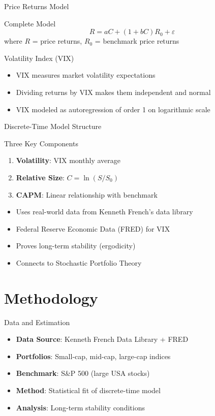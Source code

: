 \documentclass{beamer}
\begin{document}
\begin{frame}{Price Returns Model}
\begin{block}{Complete Model}
$$R = aC + (1 + bC)R_0 + \varepsilon$$
where $R$ = price returns, $R_0$ = benchmark price returns
\end{block}

\begin{block}{Volatility Index (VIX)}
\begin{itemize}
    \item VIX measures market volatility expectations
    \item Dividing returns by VIX makes them independent and normal
    \item VIX modeled as autoregression of order 1 on logarithmic scale
\end{itemize}
\end{block}
\end{frame}

\begin{frame}{Discrete-Time Model Structure}
\begin{block}{Three Key Components}
\begin{enumerate}
    \item \textbf{Volatility}: VIX monthly average
    \item \textbf{Relative Size}: $C = \ln(S/S_0)$
    \item \textbf{CAPM}: Linear relationship with benchmark
\end{enumerate}
\end{block}

\begin{itemize}
    \item Uses real-world data from Kenneth French's data library
    \item Federal Reserve Economic Data (FRED) for VIX
    \item Proves long-term stability (ergodicity)
    \item Connects to Stochastic Portfolio Theory
\end{itemize}
\end{frame}

\section{Methodology}

\begin{frame}{Data and Estimation}
\begin{itemize}
    \item \textbf{Data Source}: Kenneth French Data Library + FRED
    \item \textbf{Portfolios}: Small-cap, mid-cap, large-cap indices
    \item \textbf{Benchmark}: S\&P 500 (large USA stocks)
    \item \textbf{Method}: Statistical fit of discrete-time model
    \item \textbf{Analysis}: Long-term stability conditions
\end{itemize}
\end{frame}
\end{document}
